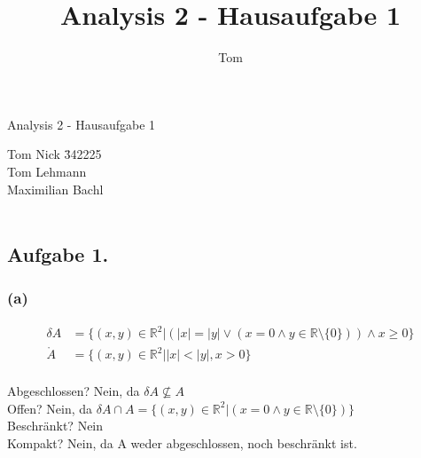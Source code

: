 \documentclass[10pt,a4paper]{scrartcl}
\author{Tom}
\title{Analysis 2 - Hausaufgabe 1}
\newcommand{\R}{\mathbb{R}}
\begin{document}
\begin{center}
\Large{Analysis 2 - Hausaufgabe 1} \\
\end{center}
\begin{tabbing}
Tom Nick \hspace{1.4cm}\= 342225\\
Tom Lehmann\\
Maximilian Bachl\\\\ 
\end{tabbing}
\subsection*{Aufgabe 1.}
\subsubsection*{\textbf{(a)}}
\begin{floatingfigure}[r]{150pt}
\end{floatingfigure}
\begin{align*}
\delta A &= \lbrace \left( x , y \right) \in \R ^2 | (|x| = |y| \lor (x = 0 \land y \in \R \setminus\lbrace0\rbrace)) \land x \geq 0 \rbrace \\
\mathring{A} &= \lbrace \left( x,y \right) \in \R ^2 | |x| < |y|, x > 0 \rbrace
\end{align*}\\
Abgeschlossen? Nein, da  $\delta A \not \subseteq A$\\
Offen? Nein, da $\delta A \cap A = \lbrace \left( x , y \right) \in \R ^2 |(x = 0 \land y \in \R \setminus \lbrace0\rbrace)\rbrace $\\
Beschränkt? Nein\\
Kompakt? Nein, da A weder abgeschlossen, noch beschränkt ist.\\
\end{document}
